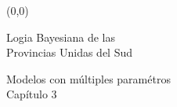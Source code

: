 \documentclass[shownotes,aspectratio=169]{beamer}
\begin{document}
 \color{black!85}

\small
{}

\begin{frame}
 
 \begin{textblock}{80}(0,0)
\begin{center}
 \huge  \textcolor{black!66}{Logia Bayesiana de las \\ Provincias Unidas del Sud}
\end{center}
\end{textblock}

{}
\end{frame}

\begin{frame}[plain]
\vspace{0.5cm}
\begin{center} 
 \LARGE Modelos con m\'ultiples param\'etros \\
 
 \large Cap\'itulo 3
\end{center}
\end{frame}
\end{document}
